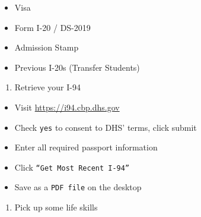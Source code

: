 \documentclass[
]{book}
\providecommand{\tightlist}{%
  \setlength{\itemsep}{0pt}\setlength{\parskip}{0pt}}
\begin{document}
\begin{itemize}
\item
  Visa
\item
  Form I-20 / DS-2019
\item
  Admission Stamp
\item
  Previous I-20s (Transfer Students)
\end{itemize}

\begin{enumerate}
\def\labelenumi{\arabic{enumi}.}
\setcounter{enumi}{1}
\tightlist
\item
  Retrieve your I-94
\end{enumerate}

\begin{itemize}
\item
  Visit \url{https://i94.cbp.dhs.gov}
\item
  Check \texttt{\textquotesingle{}yes\textquotesingle{}} to consent to DHS' terms, click submit
\item
  Enter all required passport information
\item
  Click \texttt{“Get\ Most\ Recent\ I-94”}
\item
  Save as a \texttt{PDF\ file} on the desktop
\end{itemize}

\begin{enumerate}
\def\labelenumi{\arabic{enumi}.}
\setcounter{enumi}{2}
\tightlist
\item
  Pick up some life skills
\end{enumerate}
\end{document}
